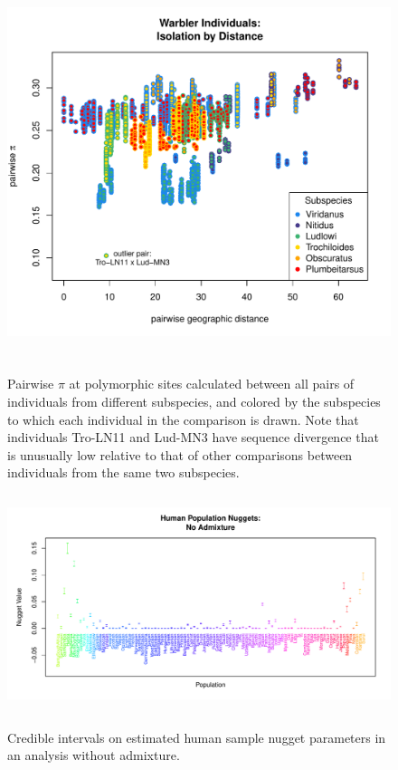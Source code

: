 \documentclass[12pt]{article}
\begin{document}
\begin{figure}
\centering
	{\includegraphics[width=5in,height=4.3in]{figs/warblers/warb_ind_pairwise_pi.pdf}}
	\caption{Pairwise $\pi$ at polymorphic sites calculated between all pairs of individuals from different subspecies, and colored by the subspecies to which each individual in the comparison is drawn.  Note that individuals Tro-LN11 and Lud-MN3 have sequence divergence that is unusually low relative to that of other comparisons between individuals from the same two subspecies.}\label{sfig:warb_ind_pwp}
\end{figure}

\begin{figure}
\centering
	{\includegraphics[width=5in,height=2.5in]{figs/globetrotter/globe_NoAd_nugget.pdf}}
	\caption{Credible intervals on estimated human sample nugget parameters in an analysis without admixture.}\label{sfig:globe_noad_nugg}
\end{figure}
\end{document}

